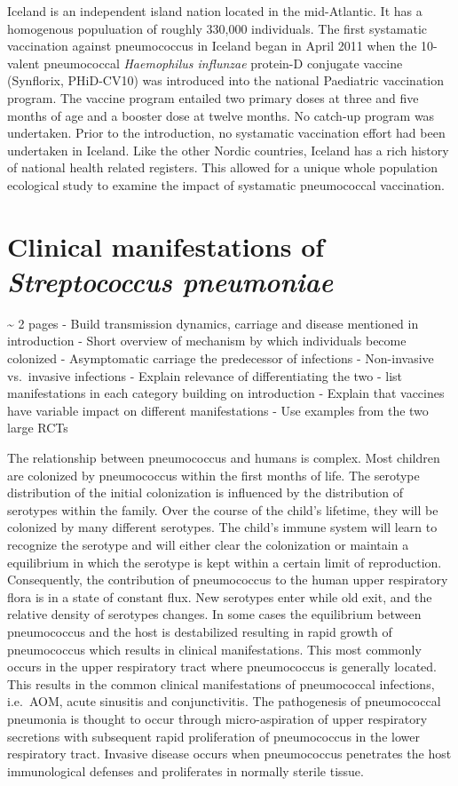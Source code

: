 \documentclass[]{book}
\theoremstyle{definition}
\theoremstyle{definition}
\theoremstyle{definition}
\theoremstyle{remark}
\begin{document}
Iceland is an independent island nation located in the mid-Atlantic. It
has a homogenous populuation of roughly 330,000 individuals. The first
systamatic vaccination against pneumococcus in Iceland began in April
2011 when the 10-valent pneumococcal \emph{Haemophilus influnzae}
protein-D conjugate vaccine (Synflorix, PHiD-CV10) was introduced into
the national Paediatric vaccination program. The vaccine program
entailed two primary doses at three and five months of age and a booster
dose at twelve months. No catch-up program was undertaken. Prior to the
introduction, no systamatic vaccination effort had been undertaken in
Iceland. Like the other Nordic countries, Iceland has a rich history of
national health related registers. This allowed for a unique whole
population ecological study to examine the impact of systamatic
pneumococcal vaccination.

\section{\texorpdfstring{Clinical manifestations of \emph{Streptococcus
pneumoniae}}{Clinical manifestations of Streptococcus pneumoniae}}\label{clinical-manifestations-of-streptococcus-pneumoniae}

\textasciitilde{} 2 pages - Build transmission dynamics, carriage and
disease mentioned in introduction - Short overview of mechanism by which
individuals become colonized - Asymptomatic carriage the predecessor of
infections - Non-invasive vs.~invasive infections - Explain relevance of
differentiating the two - list manifestations in each category building
on introduction - Explain that vaccines have variable impact on
different manifestations - Use examples from the two large RCTs

The relationship between pneumococcus and humans is complex. Most
children are colonized by pneumococcus within the first months of life.
The serotype distribution of the initial colonization is influenced by
the distribution of serotypes within the family. Over the course of the
child's lifetime, they will be colonized by many different serotypes.
The child's immune system will learn to recognize the serotype and will
either clear the colonization or maintain a equilibrium in which the
serotype is kept within a certain limit of reproduction. Consequently,
the contribution of pneumococcus to the human upper respiratory flora is
in a state of constant flux. New serotypes enter while old exit, and the
relative density of serotypes changes. In some cases the equilibrium
between pneumococcus and the host is destabilized resulting in rapid
growth of pneumococcus which results in clinical manifestations. This
most commonly occurs in the upper respiratory tract where pneumococcus
is generally located. This results in the common clinical manifestations
of pneumococcal infections, i.e.~AOM, acute sinusitis and
conjunctivitis. The pathogenesis of pneumococcal pneumonia is thought to
occur through micro-aspiration of upper respiratory secretions with
subsequent rapid proliferation of pneumococcus in the lower respiratory
tract. Invasive disease occurs when pneumococcus penetrates the host
immunological defenses and proliferates in normally sterile tissue.
\end{document}
